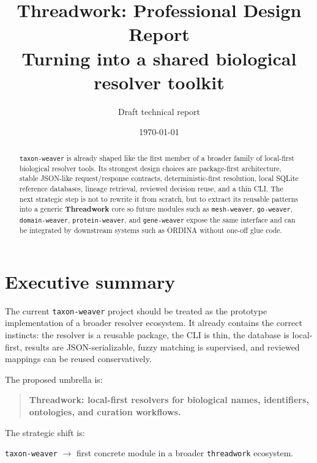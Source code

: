 \documentclass[11pt,a4paper]{article}
\title{\textbf{Threadwork: Professional Design Report}\\
\large Turning \code{taxon-weaver} into a shared biological resolver toolkit}
\author{Draft technical report}
\date{\today}
\newcommand{\code}[1]{\texttt{#1}}
\begin{document}
\maketitle

\begin{abstract}
\noindent
\code{taxon-weaver} is already shaped like the first member of a broader family of local-first biological resolver tools. Its strongest design choices are package-first architecture, stable JSON-like request/response contracts, deterministic-first resolution, local SQLite reference databases, lineage retrieval, reviewed decision reuse, and a thin CLI. The next strategic step is not to rewrite it from scratch, but to extract its reusable patterns into a generic \textbf{Threadwork} core so future modules such as \code{mesh-weaver}, \code{go-weaver}, \code{domain-weaver}, \code{protein-weaver}, and \code{gene-weaver} expose the same interface and can be integrated by downstream systems such as ORDINA without one-off glue code.
\end{abstract}

\tableofcontents
\newpage

\section{Executive summary}

The current \code{taxon-weaver} project should be treated as the prototype implementation of a broader resolver ecosystem. It already contains the correct instincts: the resolver is a reusable package, the CLI is thin, the database is local-first, results are JSON-serializable, fuzzy matching is supervised, and reviewed mappings can be reused conservatively.

The proposed umbrella is:

\begin{quote}
\textbf{Threadwork: local-first resolvers for biological names, identifiers, ontologies, and curation workflows.}
\end{quote}

The strategic shift is:

\begin{center}
\code{taxon-weaver} $\rightarrow$ first concrete module in a broader \code{threadwork} ecosystem.
\end{center}
\end{document}

